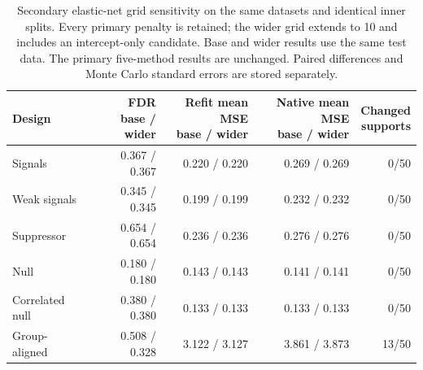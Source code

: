 \begin{table}[H]\centering\small
\setlength{\tabcolsep}{4pt}
\begin{tabular}{lrrrr}
\toprule
Design & \shortstack{FDR\\base / wider} & \shortstack{Refit mean MSE\\base / wider} & \shortstack{Native mean MSE\\base / wider} & \shortstack{Changed\\supports} \\
\midrule
Signals & 0.367 / 0.367 & 0.220 / 0.220 & 0.269 / 0.269 & 0/50 \\
Weak signals & 0.345 / 0.345 & 0.199 / 0.199 & 0.232 / 0.232 & 0/50 \\
Suppressor & 0.654 / 0.654 & 0.236 / 0.236 & 0.276 / 0.276 & 0/50 \\
Null & 0.180 / 0.180 & 0.143 / 0.143 & 0.141 / 0.141 & 0/50 \\
Correlated null & 0.380 / 0.380 & 0.133 / 0.133 & 0.133 / 0.133 & 0/50 \\
Group-aligned & 0.508 / 0.328 & 3.122 / 3.127 & 3.861 / 3.873 & 13/50 \\
\bottomrule
\end{tabular}
\caption{Secondary elastic-net grid sensitivity on the same datasets and identical inner splits. Every primary penalty is retained; the wider grid extends to 10 and includes an intercept-only candidate. Base and wider results use the same test data. The primary five-method results are unchanged. Paired differences and Monte Carlo standard errors are stored separately.}\label{tab:enet_sensitivity}
\end{table}
